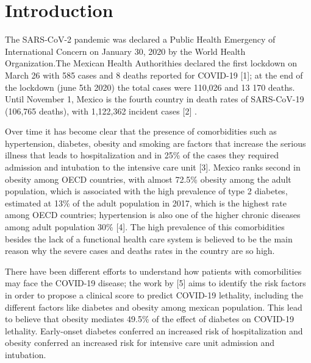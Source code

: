 \documentclass[10pt,letterpaper]{article}
\begin{document}
\linenumbers

\newcommand{\N}{\mathbb{N}}
\newcommand{\Z}{\mathbb{Z}}
\newcommand{\R}{\mathbb{R}}
\newcommand{\Q}{\mathbb{Q}}
\newcommand{\vac}{\varnothing}
\newcommand{\Pro}{\mathbb{P}}
\newcommand{\var}{\text{Var}}
\newcommand{\E}{\mathbb{E}}

\section{Introduction}\label{introduction}

The SARS-CoV-2 pandemic was declared a Public Health Emergency of
International Concern on January 30, 2020 by the World Health
Organization.The Mexican Health Authorithies declared the first lockdown
on March 26 with 585 cases and 8 deaths reported for COVID-19 {[}1{]};
at the end of the lockdown (june 5th 2020) the total cases were 110,026
and 13 170 deaths. Until November 1, Mexico is the fourth country in
death rates of SARS-CoV-19 (106,765 deaths), with 1,122,362 incident
cases {[}2{]} .

Over time it has become clear that the presence of comorbidities such as
hypertension, diabetes, obesity and smoking are factors that increase
the serious illness that leads to hospitalization and in 25\% of the
cases they required admission and intubation to the intensive care unit
{[}3{]}. Mexico ranks second in obesity among OECD countries, with
almost 72.5\% obesity among the adult population, which is associated
with the high prevalence of type 2 diabetes, estimated at 13\% of the
adult population in 2017, which is the highest rate among OECD
countries; hypertension is also one of the higher chronic diseases among
adult population 30\% {[}4{]}. The high prevalence of this comorbidities
besides the lack of a functional health care system is believed to be
the main reason why the severe cases and deaths rates in the country are
so high.

There have been different efforts to understand how patients with
comorbilities may face the COVID-19 disease; the work by {[}5{]} aims to
identify the risk factors in order to propose a clinical score to
predict COVID-19 lethality, including the different factors like
diabetes and obesity among mexican population. This lead to believe that
obesity mediates 49.5\% of the effect of diabetes on COVID-19 lethality.
Early-onset diabetes conferred an increased risk of hospitalization and
obesity conferred an increased risk for intensive care unit admission
and intubation.
\end{document}
